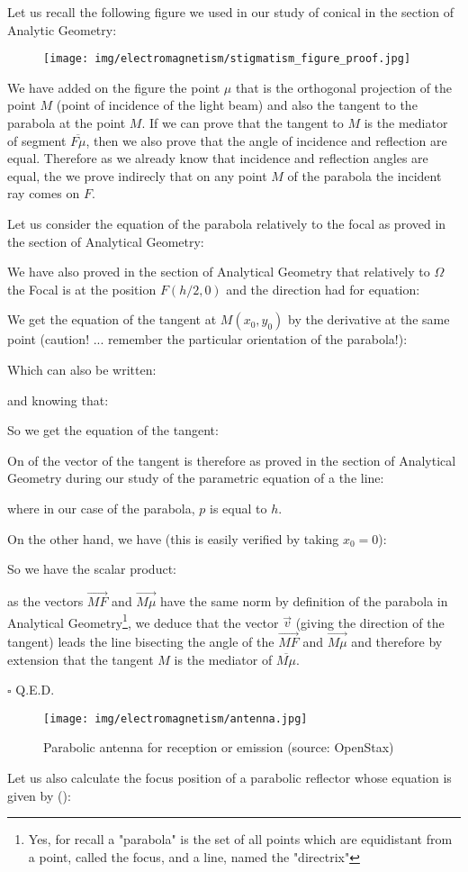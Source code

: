 Let us recall the following figure we used in our study of conical in the section of Analytic Geometry:
	\begin{figure}[H]
		\centering
		\texttt{[image: img/electromagnetism/stigmatism\_figure\_proof.jpg]}
	\end{figure}
	We have added on the figure the point $\mu$ that is the orthogonal projection of the point $M$ (point of incidence of the light beam) and also the tangent to the parabola at the point $M$. If we can prove that the tangent to $M$ is the mediator of segment $\overline{F\mu}$, then we also prove that the angle of incidence and reflection are equal. Therefore as we already know that incidence and reflection angles are equal, the we prove indirecly that on any point $M$ of the parabola the incident ray comes on $F$.
	\begin{dem}
	Let us consider the equation of the parabola relatively to the focal as proved in the section of Analytical Geometry:
	
	We have also proved in the section of Analytical Geometry that relatively to $\Omega$ the Focal is at the position $F(h/2,0)$ and the direction had for equation:
	
	We get the equation of the tangent at $M(x_0,y_0)$ by the derivative at the same point (caution! ... remember the particular orientation of the parabola!):
	
	Which can also be written:
	
	and knowing that:
	
	So we get the equation of the tangent:
	
	On of the vector of the tangent is therefore as proved in the section of Analytical Geometry during our study of the parametric equation of a the line:
	
	where in our case of the parabola, $p$ is equal to $h$.
	
	On the other hand, we have (this is easily verified by taking $x_0=0$):
	
	So we have the scalar product:
	
	as the vectors $\overrightarrow{MF}$ and $\overrightarrow{M\mu}$ have the same norm by definition of the parabola in Analytical Geometry\footnote{Yes, for recall a "parabola" is the set of all points which are equidistant from a point, called the focus, and a line, named the "directrix"}, we deduce that the vector $\vec{v}$ (giving the direction of the tangent) leads the line bisecting the angle of the $\overrightarrow{MF}$ and $\overrightarrow{M\mu}$ and therefore by extension that the tangent $M$ is the mediator of $\overline{M\mu}$.
	\begin{flushright}
		$\square$  Q.E.D.
	\end{flushright}
	\end{dem} 
	\begin{figure}[H]
		\centering
		\texttt{[image: img/electromagnetism/antenna.jpg]}	
		\caption{Parabolic antenna for reception or emission (source: OpenStax)}
	\end{figure}
	Let us also calculate the focus position of a parabolic reflector whose equation is given by ():
	

